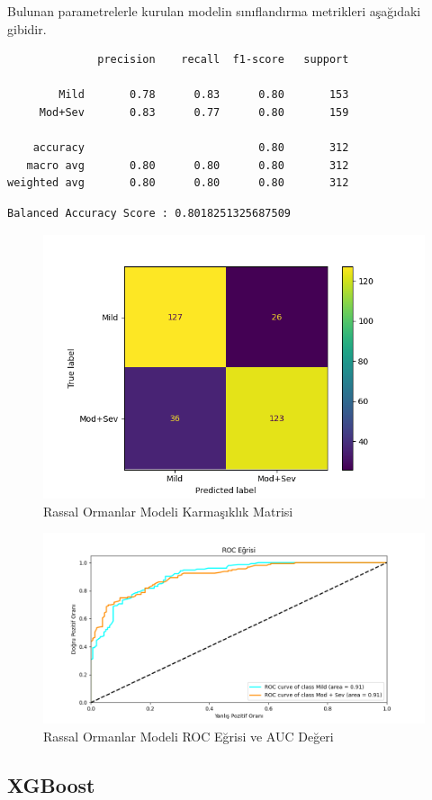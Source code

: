 \documentclass[12pt,twoside]{deuthesis}
\begin{document}
Bulunan parametrelerle kurulan modelin sınıflandırma metrikleri aşağıdaki gibidir.
\begin{verbatim}
              precision    recall  f1-score   support

        Mild       0.78      0.83      0.80       153
     Mod+Sev       0.83      0.77      0.80       159

    accuracy                           0.80       312
   macro avg       0.80      0.80      0.80       312
weighted avg       0.80      0.80      0.80       312
\end{verbatim}
\begin{verbatim}
Balanced Accuracy Score : 0.8018251325687509
\end{verbatim}
\begin{figure}

{\centering \includegraphics[width=1.05\linewidth,height=0.6\textheight]{figure/rf_bin_conf} 

}

\caption{Rassal Ormanlar Modeli Karmaşıklık Matrisi}\label{fig:unnamed-chunk-60}
\end{figure}
\begin{figure}

{\centering \includegraphics[width=1.05\linewidth,height=0.6\textheight]{figure/RandomForestClassifier_binary_roc} 

}

\caption{Rassal Ormanlar Modeli ROC Eğrisi ve AUC Değeri}\label{fig:unnamed-chunk-61}
\end{figure}
\hypertarget{bin_xgb}{%
\subsection{XGBoost}\label{bin_xgb}}
\end{document}
